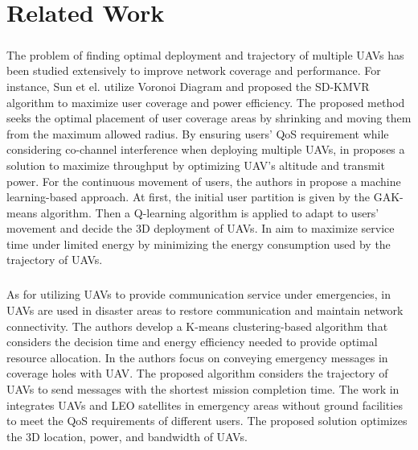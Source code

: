 \documentclass[a4paper,12pt]{report}
\begin{document}

\chapter{Related Work}
\paragraph{}
The problem of finding optimal deployment and trajectory of multiple UAVs has been studied extensively to improve network coverage and performance. For instance, Sun et el. \cite{b14} utilize Voronoi Diagram and proposed the SD-KMVR algorithm to maximize user coverage and power efficiency. The proposed method seeks the optimal placement of user coverage areas by shrinking and moving them from the maximum allowed radius. By ensuring users' QoS requirement while considering co-channel interference when deploying multiple UAVs, in \cite{b15} proposes a solution to maximize throughput by optimizing UAV's altitude and transmit power. For the continuous movement of users, the authors in \cite{b16} propose a machine learning-based approach. At first, the initial user partition is given by the GAK-means algorithm. Then a Q-learning algorithm is applied to adapt to users' movement and decide the 3D deployment of UAVs. In \cite{b17} aim to maximize service time under limited energy by minimizing the energy consumption used by the trajectory of UAVs.
\paragraph{}
As for utilizing UAVs to provide communication service under emergencies, in \cite{b18} UAVs are used in disaster areas to restore communication and maintain network connectivity. The authors develop a K-means clustering-based algorithm that considers the decision time and energy efficiency needed to provide optimal resource allocation. In \cite{b19} the authors focus on conveying emergency messages in coverage holes with UAV. The proposed algorithm considers the trajectory of UAVs to send messages with the shortest mission completion time. The work in \cite{b20} integrates UAVs and LEO satellites in emergency areas without ground facilities to meet the QoS requirements of different users. The proposed solution optimizes the 3D location, power, and bandwidth of UAVs.
\end{document}
